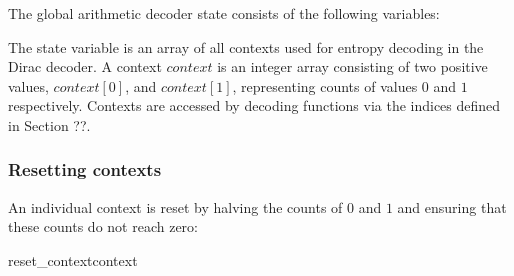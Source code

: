 \label{arithcontexts}

The global arithmetic decoder state consists of the following variables:

\begin{pseudo*}
\bsCODE{\ArithState:}
\end{pseudo*}

The state variable \AContexts is an array of all contexts
used for entropy decoding in the Dirac decoder. 
A context $context$ is an integer array consisting of two positive values,
$context[0]$, and $context[1]$, representing counts of values $0$ and $1$
respectively. Contexts are accessed by decoding functions
via the indices defined in Section ??.

\subsubsection{Resetting contexts}

An individual context is reset by halving the counts of $0$ and $1$ and ensuring that
these counts do not reach zero:

\begin{pseudo}{reset\_context}{context}
\end{pseudo}

 
